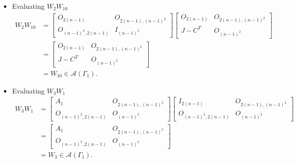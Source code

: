 \begin{itemize}
    \item Evaluating $W_2W_{10}$
    \begin{align*}
        W_2W_{10}
        &= \begin{bmatrix}
            O_{2(n-1)} & O_{2(n-1), (n-1)^2} \\
            O_{(n-1)^2, 2(n-1)} & I_{(n-1)^2}
        \end{bmatrix}\begin{bmatrix}
            O_{2(n-1)} & O_{2(n-1), (n-1)^2} \\
            J-C^T & O_{(n-1)^2}
        \end{bmatrix} \\
        &= \begin{bmatrix}
            O_{2(n-1)} & O_{2(n-1), (n-1)^2} \\
            J-C^T & O_{(n-1)^2}
        \end{bmatrix} \\
        &= W_{10}\in\mathcal{A}(\Gamma_1).
    \end{align*}
    
    \item Evaluating $W_3W_1$
    \begin{align*}
        W_3W_1 
        &=
        \begin{bmatrix}
            A_1 & O_{2(n-1), (n-1)^2} \\
            O_{(n-1)^2, 2(n-1)} & O_{(n-1)^2}
        \end{bmatrix}\begin{bmatrix}
            I_{2(n-1)} & O_{2(n-1), (n-1)^2} \\
            O_{(n-1)^2, 2(n-1)} & O_{(n-1)^2}
        \end{bmatrix} \\
        &= \begin{bmatrix}
            A_1 & O_{2(n-1), (n-1)^2} \\
            O_{(n-1)^2, 2(n-1)} & O_{(n-1)^2}
        \end{bmatrix} \\
        &= W_3 \in \mathcal{A}(\Gamma_1).
    \end{align*}
    

\end{itemize}
